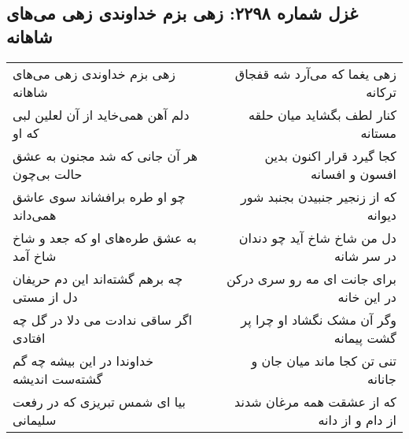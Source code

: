 \begin{center}
\section*{غزل شماره ۲۲۹۸: زهی بزم خداوندی زهی می‌های شاهانه}
\label{sec:2298}
\begin{longtable}{l p{0.5cm} r}
زهی بزم خداوندی زهی می‌های شاهانه
&&
زهی یغما که می‌آرد شه قفجاق ترکانه
\\
دلم آهن همی‌خاید از آن لعلین لبی که او
&&
کنار لطف بگشاید میان حلقه مستانه
\\
هر آن جانی که شد مجنون به عشق حالت بی‌چون
&&
کجا گیرد قرار اکنون بدین افسون و افسانه
\\
چو او طره برافشاند سوی عاشق همی‌داند
&&
که از زنجیر جنبیدن بجنبد شور دیوانه
\\
به عشق طره‌های او که جعد و شاخ شاخ آمد
&&
دل من شاخ شاخ آید چو دندان در سر شانه
\\
چه برهم گشته‌اند این دم حریفان دل از مستی
&&
برای جانت ای مه رو سری درکن در این خانه
\\
اگر ساقی ندادت می دلا در گل چه افتادی
&&
وگر آن مشک نگشاد او چرا پر گشت پیمانه
\\
خداوندا در این بیشه چه گم گشته‌ست اندیشه
&&
تنی تن کجا ماند میان جان و جانانه
\\
بیا ای شمس تبریزی که در رفعت سلیمانی
&&
که از عشقت همه مرغان شدند از دام و از دانه
\\
\end{longtable}
\end{center}
